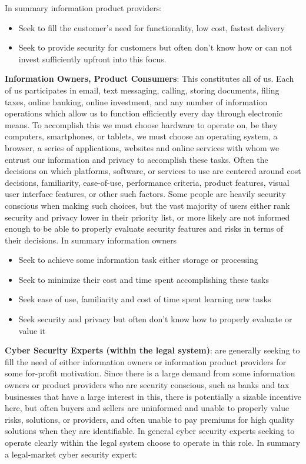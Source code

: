 \documentclass[conference]{IEEEtran}
\begin{document}
In summary information product providers:

\begin{itemize}
  \item Seek to fill the customer's need for functionality, low cost, fastest delivery
  \item Seek to provide security for customers but often don't know how or can not invest sufficiently upfront into this focus.
\end{itemize}

\textbf{Information Owners, Product Consumers}: This constitutes all of us.  Each of us participates in email, text messaging, calling, storing documents, filing taxes, online banking, online investment, and any number of information operations which allow us to function efficiently every day through electronic means.   To accomplish this we must choose hardware to operate on, be they computers, smartphones, or tablets, we must choose an operating system, a browser, a series of applications, websites and online services with whom we entrust our information and privacy to accomplish these tasks.  Often the decisions on which platforms, software, or services to use are centered around cost decisions, familiarity, ease-of-use, performance criteria, product features, visual user interface features, or other such factors.  Some people are heavily security conscious when making such choices, but the vast majority of users either rank security and privacy lower in their priority list, or more likely are not informed enough to be able to properly evaluate security features and risks in terms of their decisions.
In summary information owners

\begin{itemize}
 \item Seek to achieve some information task either storage or processing
 \item Seek to minimize their cost and time spent accomplishing these tasks
 \item Seek ease of use, familiarity and cost of time spent learning new tasks
 \item Seek security and privacy but often don’t know how to properly evaluate or value it
\end{itemize}

\textbf{Cyber Security Experts (within the legal system)}: 
are generally seeking to fill the need of either information owners or information product providers for some for-profit motivation.   Since there is a large demand from some information owners or product providers who are security conscious, such as banks and tax businesses that have a large interest in this, there is potentially a sizable incentive here, but often buyers and sellers are uninformed and unable to properly value risks, solutions, or providers, and often unable to pay premiums for high quality solutions when they are identifiable.   In general cyber security experts seeking to operate clearly within the legal system choose to operate in this role.
In summary a legal-market cyber security expert:
\end{document}
